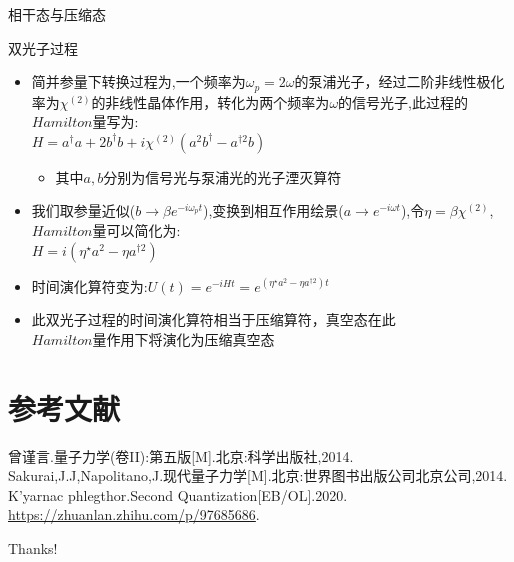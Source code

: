 \documentclass{beamer}
\begin{document}
\begin{frame}{相干态与压缩态}
	\begin{block}{双光子过程}
		\begin{itemize}
			\item 简并参量下转换过程为,一个频率为$\omega_{p}=2\omega$的泵浦光子，经过二阶非线性极化率为$\chi^{(2)}$的非线性晶体作用，转化为两个频率为$\omega$的信号光子,此过程的$Hamilton$量写为:\\$H=a^{\dagger}a+2b^{\dagger}b+i\chi^{(2)}(a^{2}b^{\dagger}-a^{\dagger2}b)$
			\begin{itemize}
				\item 其中$a,b$分别为信号光与泵浦光的光子湮灭算符
			\end{itemize}
		\item 我们取参量近似($b\rightarrow \beta e^{-i\omega_{p} t}$),变换到相互作用绘景($a\rightarrow e^{-i\omega t}$),令$\eta=\beta\chi^{(2)}$,$Hamilton$量可以简化为:\\$H=i(\eta^{\star}a^{2}-\eta a^{\dagger2})$
		\item 时间演化算符变为:$U(t)=e^{-iHt}=e^{(\eta^{\star}a^{2}-\eta a^{\dagger2})t}$
		\item \small{此双光子过程的时间演化算符相当于压缩算符，真空态在此\\$Hamilton$量作用下将演化为压缩真空态}
		\end{itemize}
	\end{block}
\end{frame}
\section{参考文献}
\begin{frame}[allowframebreaks]
	\begin{thebibliography}{99}
		曾谨言.量子力学(卷II):第五版[M].北京:科学出版社,2014.
		Sakurai,J.J,Napolitano,J.现代量子力学[M].北京:世界图书出版公司北京公司,2014.
		K'yarnac phlegthor.Second Quantization[EB/OL].2020.\\ \url{https://zhuanlan.zhihu.com/p/97685686}.
	\end{thebibliography}
\end{frame}

	\begin{frame}
		\begin{center}
			{\Huge\calligra Thanks!}
		\end{center}
	\end{frame}
	
\end{document}
